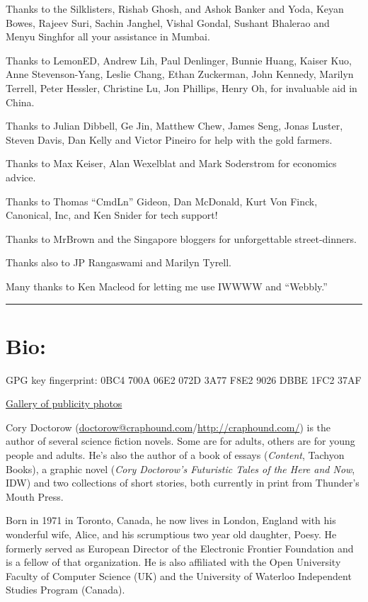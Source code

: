 Thanks to the Silklisters, Rishab Ghosh, and Ashok Banker and Yoda,
Keyan Bowes, Rajeev Suri, Sachin Janghel, Vishal Gondal, Sushant
Bhalerao and Menyu Singhfor all your assistance in Mumbai.

Thanks to LemonED, Andrew Lih, Paul Denlinger, Bunnie Huang, Kaiser
Kuo, Anne Stevenson-Yang, Leslie Chang, Ethan Zuckerman, John
Kennedy, Marilyn Terrell, Peter Hessler, Christine Lu, Jon
Phillips, Henry Oh, for invaluable aid in China.

Thanks to Julian Dibbell, Ge Jin, Matthew Chew, James Seng, Jonas
Luster, Steven Davis, Dan Kelly and Victor Pineiro for help with
the gold farmers.

Thanks to Max Keiser, Alan Wexelblat and Mark Soderstrom for
economics advice.

Thanks to Thomas ``CmdLn'' Gideon, Dan McDonald, Kurt Von Finck,
Canonical, Inc, and Ken Snider for tech support!

Thanks to MrBrown and the Singapore bloggers for unforgettable
street-dinners.

Thanks also to JP Rangaswami and Marilyn Tyrell.

Many thanks to Ken Macleod for letting me use IWWWW and ``Webbly.''

\begin{center}\rule{3in}{0.4pt}\end{center}

\section{Bio:}

GPG key fingerprint: 0BC4 700A 06E2 072D 3A77 F8E2 9026 DBBE 1FC2
37AF

\href{http://www.flickr.com/photos/doctorow/sets/72157622138315932/}{Gallery of publicity photos}

Cory Doctorow
(\url{doctorow@craphound.com}/\url{http://craphound.com/})
is the author of several science fiction novels. Some are for
adults, others are for young people and adults. He's also the
author of a book of essays (\emph{Content}, Tachyon Books), a
graphic novel
(\emph{Cory Doctorow's Futuristic Tales of the Here and Now}, IDW)
and two collections of short stories, both currently in print from
Thunder's Mouth Press.

Born in 1971 in Toronto, Canada, he now lives in London, England
with his wonderful wife, Alice, and his scrumptious two year old
daughter, Poesy. He formerly served as European Director of the
Electronic Frontier Foundation and is a fellow of that
organization. He is also affiliated with the Open University
Faculty of Computer Science (UK) and the University of Waterloo
Independent Studies Program (Canada).

